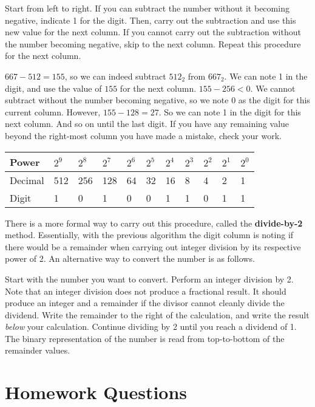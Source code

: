 \documentclass[letterpaper, 12pt]{book}
\begin{document}
\vspace{1em}
Start from left to right. If you can subtract the number without it becoming negative, indicate 1 for the digit. Then, carry out the subtraction and use this new value for the next column. If you cannot carry out the subtraction without the number becoming negative, skip to the next column. Repeat this procedure for the next column.

 $667-512=155$, so we can indeed subtract $512_2$ from $667_2$. We can note 1 in the digit, and use the value of $155$ for the next column. $155-256<0$. We cannot subtract without the number becoming negative, so we note 0 as the digit for this current column. However, $155-128=27$. So we can note 1 in the digit for this next column. And so on until the last digit. If you have any remaining value beyond the right-most column you have made a mistake, check your work.

\vspace{1em}
\begin{tabular}{|l|l|l|l|l|l|l|l|l|l|l|}\hline
Power & $2^9$ & $2^8$ & $2^7$ & $2^6$ & $2^5$ & $2^4$ & $2^3$ & $2^2$ & $2^1$ & $2^0$ \\\hline\hline
Decimal & 512 & 256 & 128 & 64 & 32 & 16 & 8 & 4 & 2 & 1 \\\hline
Digit & 1 & 0 & 1 & 0 & 0 & 1 & 1 & 0 & 1 & 1 \\\hline
\end{tabular}

\vspace{1em}
There is a more formal way to carry out this procedure, called the \textbf{divide-by-2} method. Essentially, with the previous algorithm the digit column is noting if there would be a remainder when carrying out integer division by its respective power of 2. An alternative way to convert the number is as follows.

Start with the number you want to convert. Perform an integer division by 2. Note that an integer division does not produce a fractional result. It should produce an integer and a remainder if the divisor cannot cleanly divide the dividend. Write the remainder to the right of the calculation, and write the result \textit{below} your calculation. Continue dividing by 2 until you reach a dividend of 1. The binary representation of the number is read from top-to-bottom of the remainder values.

\vfill\clearpage
\section*{Homework Questions}
\end{document}

